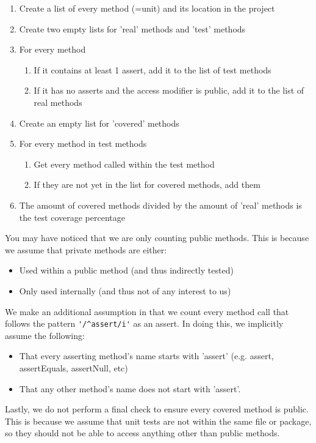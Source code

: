 \documentclass{article}
\begin{document}
\begin{enumerate}
\item Create a list of every method (=unit) and its location in the project
\item Create two empty lists for 'real' methods and 'test' methods
\item For every method
	\begin{enumerate}
	\item If it contains at least 1 assert, add it to the list of test methods
	\item If it has no asserts and the access modifier is public, add it to the list of real methods
	\end{enumerate}
\item Create an empty list for 'covered' methods
\item For every method in test methods
	\begin{enumerate}
	\item Get every method called within the test method
	\item If they are not yet in the list for covered methods, add them
	\end{enumerate}
\item The amount of covered methods divided by the amount of 'real' methods is the test coverage percentage
\end{enumerate}

You may have noticed that we are only counting public methods. This is because we assume that private methods are either:

\begin{itemize}
\item Used within a public method (and thus indirectly tested)
\item Only used internally (and thus not of any interest to us)
\end{itemize}

We make an additional assumption in that we count every method call that follows the pattern \verb|'/^assert/i'| as an assert. In doing this, we implicitly assume the following:
\begin{itemize}
\item That every asserting method's name starts with 'assert' (e.g. assert, assertEquals, assertNull, etc)
\item That any other method's name does not start with 'assert'.
\end{itemize}

Lastly, we do not perform a final check to ensure every covered method is public. This is because we assume that unit tests are not within the same file or package, so they should not be able to access anything other than public methods.
\end{document}
